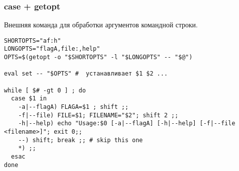\begin{frame}[fragile]
\frametitle{case + getopt}
	Внешняя команда для обработки аргументов командной строки.
	\small
	\begin{lstlisting}
SHORTOPTS="af:h"
LONGOPTS="flagA,file:,help"
OPTS=$(getopt -o "$SHORTOPTS" -l "$LONGOPTS" -- "$@")

eval set -- "$OPTS" #  устанавливает $1 $2 ...

while [ $# -gt 0 ] ; do
  case $1 in
    -a|--flagA) FLAGA=$1 ; shift ;;
    -f|--file) FILE=$1; FILENAME="$2"; shift 2 ;;
    -h|--help) echo "Usage:$0 [-a|--flagA] [-h|--help] [-f|--file <filename>]"; exit 0;;
    --) shift; break ;; # skip this one
    *) ;;
  esac
done
\end{lstlisting}
\end{frame}
